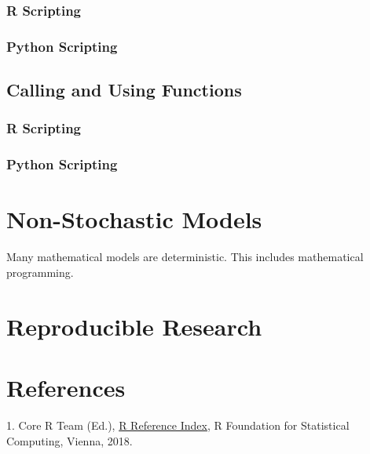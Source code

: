 \documentclass[]{book}
\theoremstyle{definition}
\theoremstyle{definition}
\theoremstyle{definition}
\theoremstyle{remark}
\begin{document}
\subsection{R Scripting}\label{r-scripting-9}

\subsection{Python Scripting}\label{python-scripting-10}

\section{Calling and Using
Functions}\label{calling-and-using-functions-1}

\subsection{R Scripting}\label{r-scripting-10}

\subsection{Python Scripting}\label{python-scripting-11}

\chapter{Non-Stochastic Models}\label{non-stochastic-models}

 Many mathematical models are deterministic. This
includes mathematical programming.

\chapter{Reproducible Research}\label{reproducible-research}

 

\chapter{References}\label{references}

 1. Core R Team (Ed.), 
\href{https://cran.cnr.berkeley.edu/doc/manuals/r-release/fullrefman.pdf}{R
Reference Index}, R Foundation for Statistical Computing, Vienna, 2018.
\end{document}
